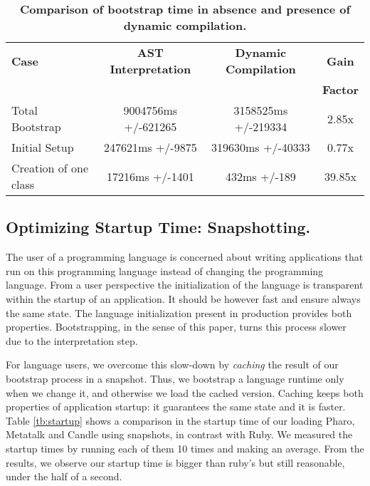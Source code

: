  \begin{table}[ht]
 \small
 	\centering
 	\begin{tabular}{lccc}
			\toprule
			\textbf{Case}
 			& \textbf{AST Interpretation}
			& \textbf{Dynamic Compilation}
			& \textbf{Gain}\\
			&&& \textbf{Factor}\\
		\toprule
		Total Bootstrap & 9004756ms +/-621265 & 3158525ms +/-219334 & 2.85x\\\midrule
 		Initial Setup& 247621ms +/-9875 & 319630ms +/-40333 & 0.77x\\\midrule
		Creation of one class & 17216ms +/-1401 & 432ms +/-189 & 39.85x\\\bottomrule
 	\end{tabular}
	\vspace*{0.2cm}
 	\caption{\small\textbf{Comparison of bootstrap time in absence and presence of dynamic compilation.}\label{tb:dynamic_compilation}}
 \end{table}

\subsection*{Optimizing Startup Time: Snapshotting.}
The user of a programming language is concerned about writing applications that run on this programming language instead of changing the programming language. From a user perspective the initialization of the language is transparent within the startup of an application. It should be however fast and ensure always the same state.
The language initialization present in production \VMs provides both properties. Bootstrapping, in the sense of this paper, turns this process slower due to the interpretation step.

For language users, we overcome this slow-down by \emph{caching} the result of our bootstrap process in a snapshot. Thus, we bootstrap a language runtime only when we change it, and otherwise we load the cached version. Caching keeps both properties of application startup: it guarantees the same state and it is faster. Table \ref{tb:startup} shows a comparison in the startup time of our \VM loading Pharo, Metatalk and Candle using snapshots, in contrast with Ruby. We measured the startup times by running each of them 10 times and making an average. From the results, we observe our startup time is bigger than ruby's but still reasonable, under the half of a second.

